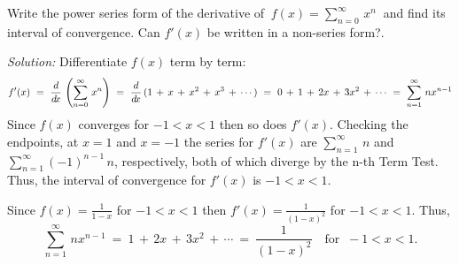 \begin{exmp}\label{exmp:seriesderivxn}
\noindent Write the power series form of the derivative of
$~f(x) = \displaystyle\sum_{n=0}^{\infty} \,x^n~$ and find its interval of
convergence. Can $f'(x)$ be written in a non-series form?.\vspace{1mm}
\par\noindent\emph{Solution:} Differentiate $f(x)$ term by term:
\[
f'(x) ~=~ \frac{d}{d\!x}\,\left(\sum_{n=0}^{\infty} \,x^n\right) ~=~
\frac{d}{d\!x}\,(1 \,+\, x \,+\, x^2 \,+\, x^3 \,+\, \cdots) ~=~
0 \,+\, 1 \,+\, 2x \,+\, 3x^2 \,+\, \cdots ~=~
\sum_{n=1}^{\infty} \,n x^{n-1}
\]
Since $f(x)$ converges for $-1<x<1$ then so does $f'(x)$. Checking the
endpoints, at $x=1$ and $x=-1$ the series for $f'(x)$ are
$\sum_{n=1}^{\infty}\,n$ and $\sum_{n=1}^{\infty} (-1)^{n-1}\,n$, respectively,
both of which diverge by the n-th Term Test. Thus, the interval of convergence
for $f'(x)$ is $-1<x<1$.\vspace{1mm}

\par\noindent Since $f(x)=\frac{1}{1-x}$ for $-1<x<1$ then
$f'(x)=\frac{1}{(1-x)^2}$ for $-1<x<1$. Thus,
\[
\sum_{n=1}^{\infty} \,n x^{n-1} ~=~ 1 \,+\, 2x \,+\, 3x^2 \,+\, \cdots ~=~
\frac{1}{(1-x)^2} \quad\text{for $~-1<x<1$.}
\]
\end{exmp}
\divider
\vspace{2mm}

\\

